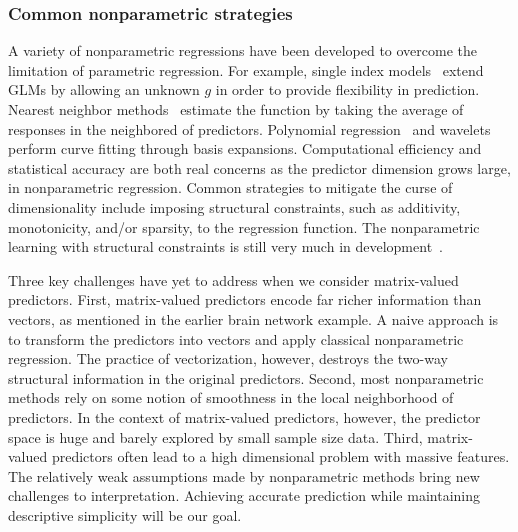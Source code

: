\documentclass[11pt]{article}
\theoremstyle{plain}
\theoremstyle{definition}
\begin{document}
\subsubsection{Common nonparametric strategies}
A variety of nonparametric regressions have been developed to overcome the limitation of parametric regression. For example, single index models~\citep{hardle1993optimal} extend GLMs by allowing an unknown $g$ in order to provide flexibility in prediction. Nearest neighbor methods~\citep{altman1992introduction} estimate the function by taking the average of responses in the neighbored of predictors. Polynomial regression~\citep{wahba1990spline} and wavelets~\citep{donoho1998minimax} perform curve fitting through basis expansions. Computational efficiency and statistical accuracy are both real concerns as the predictor dimension grows large, in nonparametric regression. Common strategies to mitigate the curse of dimensionality include imposing structural constraints, such as additivity, monotonicity, and/or sparsity, to the regression function.  The nonparametric learning with structural constraints is still very much in development~\citep{geenens2011curse,guntuboyina2018nonparametric}.

Three key challenges have yet to address when we consider matrix-valued predictors. First, matrix-valued predictors encode far richer information than vectors, as mentioned in the earlier brain network example. A naive approach is to transform the predictors into vectors and apply classical nonparametric regression. The practice of vectorization, however, destroys the two-way structural information in the original predictors. 
Second, most nonparametric methods rely on some notion of smoothness in the local neighborhood of predictors. In the context of matrix-valued predictors, however, the predictor space is huge and barely explored by small sample size data. Third, matrix-valued predictors often lead to a high dimensional problem with massive features. The relatively weak assumptions made by nonparametric methods bring new challenges to interpretation. Achieving accurate prediction while maintaining descriptive simplicity will be our goal.
\end{document}
